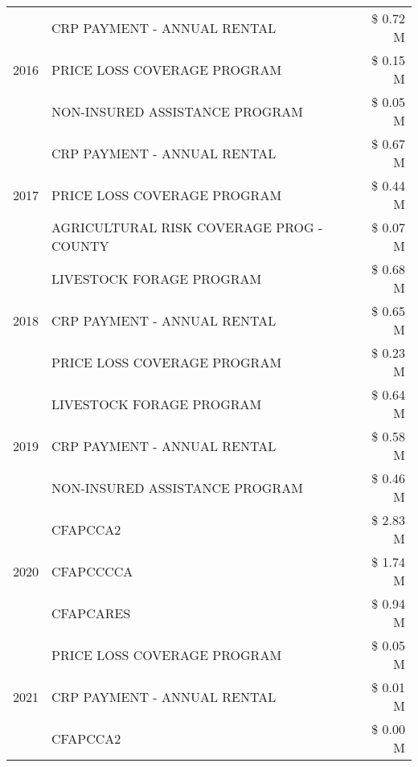 \begin{tabular}{llr}
\cline{1-3}
\multirow[t]{3}{*}{2016} & CRP PAYMENT - ANNUAL RENTAL                   & \$ 0.72 M \\
 & PRICE LOSS COVERAGE PROGRAM                   & \$ 0.15 M \\
 & NON-INSURED ASSISTANCE PROGRAM                & \$ 0.05 M \\
\cline{1-3}
\multirow[t]{3}{*}{2017} & CRP PAYMENT - ANNUAL RENTAL & \$ 0.67 M \\
 & PRICE LOSS COVERAGE PROGRAM & \$ 0.44 M \\
 & AGRICULTURAL RISK COVERAGE PROG - COUNTY & \$ 0.07 M \\
\cline{1-3}
\multirow[t]{3}{*}{2018} & LIVESTOCK FORAGE PROGRAM & \$ 0.68 M \\
 & CRP PAYMENT - ANNUAL RENTAL & \$ 0.65 M \\
 & PRICE LOSS COVERAGE PROGRAM & \$ 0.23 M \\
\cline{1-3}
\multirow[t]{3}{*}{2019} & LIVESTOCK FORAGE PROGRAM & \$ 0.64 M \\
 & CRP PAYMENT - ANNUAL RENTAL & \$ 0.58 M \\
 & NON-INSURED ASSISTANCE PROGRAM & \$ 0.46 M \\
\cline{1-3}
\multirow[t]{3}{*}{2020} & CFAPCCA2 & \$ 2.83 M \\
 & CFAPCCCCA & \$ 1.74 M \\
 & CFAPCARES & \$ 0.94 M \\
\cline{1-3}
\multirow[t]{3}{*}{2021} & PRICE LOSS COVERAGE PROGRAM & \$ 0.05 M \\
 & CRP PAYMENT - ANNUAL RENTAL & \$ 0.01 M \\
 & CFAPCCA2 & \$ 0.00 M \\
\cline{1-3}
\bottomrule
\end{tabular}
